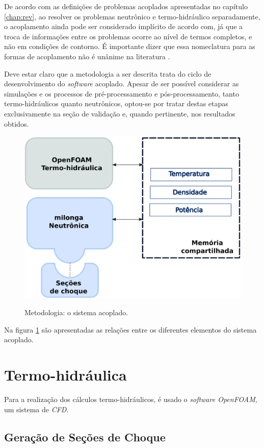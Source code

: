 De acordo com as definições de problemas acoplados apresentadas
no capítulo \ref{chap:rev}, ao resolver os problemas neutrônico e termo-hidráulico
separadamente, o acoplamento ainda pode ser considerado implícito de acordo com, já que a troca de informações entre os problemas ocorre ao nível de termos completos,
e não em condições de contorno. É importante dizer que essa nomeclatura para as formas
de acoplamento não é unânime na literatura \cite{Ivanov2007}.

Deve estar claro que a metodologia a ser descrita trata do ciclo de desenvolvimento
do \textit{software} acoplado. Apesar de ser possível considerar as simulações e
os processos de pré-processamento e pós-processamento, tanto termo-hidráulicos quanto
neutrônicos, optou-se por tratar destas etapas exclusivamente na seção de validação e,
quando pertinente, nos resultados obtidos.

\begin{figure}[htb]
  \caption{Metodologia: o sistema acoplado.}
  \centering\includegraphics[scale=0.7]{figuras/metodologia1.png}
  \label{metodoetapas}
\end{figure}

Na figura \ref{metodoetapas} são apresentadas as relações entre os diferentes elementos
do sistema acoplado.



\section{Termo-hidráulica}
\label{sec:th}

Para a realização dos cálculos termo-hidráulicos, é usado o \textit{software OpenFOAM},
um sistema de \textit{CFD}.

\subsection{Geração de Seções de Choque}
\label{sub:xs}

